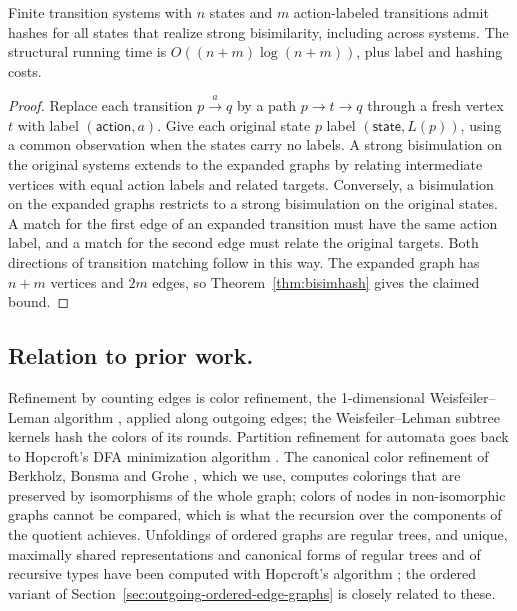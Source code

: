 \documentclass[twoside,leqno]{article}
\begin{document}
\begin{cor}
\label{cor:action-bisimhash}
Finite transition systems with $n$ states and $m$ action-labeled transitions admit hashes for all states that realize strong bisimilarity, including across systems. The structural running time is $O((n+m)\log(n+m))$, plus label and hashing costs.
\end{cor}
\begin{proof}
Replace each transition $p\xrightarrow{a}q$ by a path $p\to t\to q$ through a fresh vertex $t$ with label $(\textsf{action},a)$. Give each original state $p$ label $(\textsf{state},L(p))$, using a common observation when the states carry no labels. A strong bisimulation on the original systems extends to the expanded graphs by relating intermediate vertices with equal action labels and related targets. Conversely, a bisimulation on the expanded graphs restricts to a strong bisimulation on the original states. A match for the first edge of an expanded transition must have the same action label, and a match for the second edge must relate the original targets. Both directions of transition matching follow in this way. The expanded graph has $n+m$ vertices and $2m$ edges, so Theorem~\ref{thm:bisimhash} gives the claimed bound.
\end{proof}

\subsection{Relation to prior work.}
\label{sec:local-prior-work}
Refinement by counting edges is color refinement, the 1-dimensional Weisfeiler--Leman algorithm \cite{weisfeiler1968reduction}, applied along outgoing edges; the Weisfeiler--Lehman subtree kernels \cite{Shervashidze2011-dt,fast_subtree_kernels_on_graphs} hash the colors of its rounds. Partition refinement for automata goes back to Hopcroft's DFA minimization algorithm \cite{hopcraft, hopcraft-redescribe}. The canonical color refinement of Berkholz, Bonsma and Grohe \cite{berkholz2017tight}, which we use, computes colorings that are preserved by isomorphisms of the whole graph; colors of nodes in non-isomorphic graphs cannot be compared, which is what the recursion over the components of the quotient achieves. Unfoldings of ordered graphs are regular trees, and unique, maximally shared representations and canonical forms of regular trees and of recursive types have been computed with Hopcroft's algorithm \cite{mauborgne2000incremental,considine2000efficient,gauthier2004numbering}; the ordered variant of Section~\ref{sec:outgoing-ordered-edge-graphs} is closely related to these.
\end{document}
